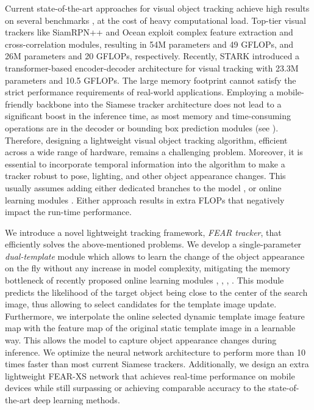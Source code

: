 \documentclass[runningheads]{llncs}
\begin{document}
Current state-of-the-art approaches for visual object tracking achieve high results on several benchmarks \cite{VOT}, \cite{VOT2020} at the cost of heavy computational load. 
Top-tier visual trackers like SiamRPN++ \cite{SiamRPN++} and Ocean \cite{Ocean} exploit complex feature extraction and cross-correlation modules, resulting in 54M parameters and 49 GFLOPs, and 26M parameters and 20 GFLOPs, respectively. 
Recently, STARK \cite{STARK} introduced a transformer-based encoder-decoder architecture for visual tracking with 23.3M parameters and 10.5 GFLOPs.
The large memory footprint cannot satisfy the strict performance requirements of real-world applications.
Employing a mobile-friendly backbone into the Siamese tracker architecture does not lead to a significant boost in the inference time, as most memory and time-consuming operations are in the decoder or bounding box prediction modules (see ).
Therefore, designing a lightweight visual object tracking algorithm, efficient across a wide range of hardware, remains a challenging problem.
Moreover, it is essential to incorporate temporal information into the algorithm to make a tracker robust to pose, lighting, and other object appearance changes.  
This usually assumes adding either dedicated branches to the model \cite{STARK}, or online learning modules \cite{DiMP}. 
Either approach results in extra FLOPs that negatively impact the run-time performance.

We introduce a novel lightweight tracking framework, \emph{FEAR tracker}, that efficiently solves the above-mentioned problems.
We develop a single-parameter \emph{dual-template} module which allows to learn the change of the object appearance on the fly without any increase in model complexity, mitigating the memory bottleneck of recently proposed online learning modules \cite{ATOM}, \cite{DiMP}, \cite{KYS}, \cite{prDIMP}.
This module predicts the likelihood of the target object being close to the center of the search image, thus allowing to select candidates for the template image update.
Furthermore, we interpolate the online selected dynamic template image feature map with the feature map of the original static template image in a learnable way. 
This allows the model to capture object appearance changes during inference.
We optimize the neural network architecture to perform more than 10 times faster than most current Siamese trackers.
Additionally, we design an extra lightweight FEAR-XS network that achieves real-time performance on mobile devices while still surpassing or achieving comparable accuracy to the state-of-the-art deep learning methods.
\end{document}
